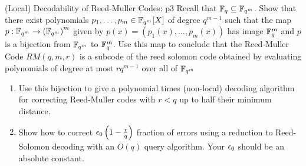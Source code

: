 \documentclass[a4paper, 11pt]{article}
\begin{document}
\begin{problem}{%
		(Local) Decodability of Reed-Muller Codes:
	}{p3%
	}
	Recall that $\mathbb{F}_q\subseteq \mathbb{F}_{q^m}$. Show that there exist polynomials $p_1,\dots, p_m\in \mathbb{F}_{q^m}[X]$ of degree $q^{m-1}$ such that the map $p:\mathbb{F}_{q^m}\to \left(\mathbb{F}_{q^m}\right)^m$ given by $p(x)=(p_1(x),\dots, p_m(x))$ has image $\mathbb{F}_q^m$ and $p$ is a bijection from $\mathbb{F}_{q^m}$ to $\mathbb{F}_q^m$. Use this map to conclude that the Reed-Muller Code $RM(q,m,r)$ is a subcode of the reed solomon code obtained by evaluating polynomials of degree at most $rq^{m-1}$ over all of $\mathbb{F}_{q^m}$\begin{enumerate}[label=(\alph*)]
		\item Use this bijection to give a polynomial times (non-local) decoding algorithm for correcting Reed-Muller codes with $r<q$ up to half their minimum distance.
		\item Show how to correct $\epsilon_0\left(1-\frac{r}{q}\right)$ fraction of errors using a reduction to Reed-Solomon decoding with an $O(q)$ query algorithm. Your $\epsilon_0$ should be an absolute constant.
	\end{enumerate}
\end{problem}

\solve{
}
\end{document}
